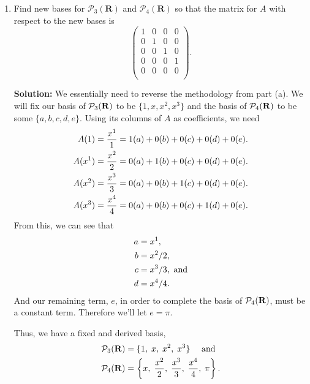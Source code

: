 \begin{enumerate}
\begin{mybox}
        \end{mybox}\newpage
        \item Find new bases for $\mathcal{P}_3(\mathbf{R})$ and $\mathcal{P}_4(\mathbf{R})$ so that the matrix for $A$ with respect to the new bases is
            \[
        \left(
          \begin{array}{cccc}
            1 & 0 & 0 & 0 \\
            0 & 1 & 0 & 0 \\
            0 & 0 & 1 & 0 \\
            0 & 0 & 0 & 1 \\
            0 & 0 & 0 & 0 \\
          \end{array}
        \right).
        \]\vspace{0.4in}
        \begin{mybox}
            \textbf{Solution: } We essentially need to reverse the methodology from part (a). We will fix our basis of $\mathcal{P}_{3}(\mathbf{R})$ to be $\{1,x,x^2,x^3\}$ and the basis of $\mathcal{P}_{4}(\mathbf{R})$ to be some $\{a,b,c,d,e\}$. Using its columns of $A$ as coefficients, we need
            \begin{align}
                A(1) &= \frac{x^1}{1} = 1(a) + 0(b) + 0(c) + 0(d) + 0(e).\notag\\
                A(x^1) &= \frac{x^2}{2} = 0(a) + 1(b) + 0(c) + 0(d) + 0(e).\notag\\
                A(x^2) &= \frac{x^3}{3} = 0(a) + 0(b) + 1(c) + 0(d) + 0(e).\notag\\
                A(x^3) &= \frac{x^4}{4} = 0(a) + 0(b) + 0(c) + 1(d) + 0(e).\notag
            \end{align}
            From this, we can see that
            \begin{align}
                a &= x^1,\notag\\
                b &= x^2/2,\notag\\
                c &= x^3/3,\text{ and}\notag\\
                d &= x^4/4.\notag
            \end{align}
            And our remaining term, $e$, in order to complete the basis of $\mathcal{P}_{4}(\mathbf{R})$, must be a constant term. Therefore we'll let $e = \pi$.
            
            \nl Thus, we have a fixed and derived basis,
            \begin{align}
                \mathcal{P}_{3}(\mathbf{R}) &= \{1,\;x,\;x^2,\;x^3\} \quad \text{ and}\notag\\
                \mathcal{P}_{4}(\mathbf{R}) &= \left\{x,\;\frac{x^2}{2},\;\frac{x^3}{3},\;\frac{x^4}{4}, \;\pi\right\}.\notag
            \end{align}
        \end{mybox}
        \end{enumerate}